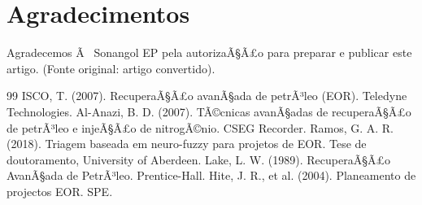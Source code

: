 \documentclass[11pt,a4paper]{article}
\begin{document}
\section*{Agradecimentos}
Agradecemos Ã  Sonangol EP pela autorizaÃ§Ã£o para preparar e publicar este artigo. (Fonte original: artigo convertido).

\begin{thebibliography}{99}
 ISCO, T. (2007). RecuperaÃ§Ã£o avanÃ§ada de petrÃ³leo (EOR). Teledyne Technologies.
 Al-Anazi, B. D. (2007). TÃ©cnicas avanÃ§adas de recuperaÃ§Ã£o de petrÃ³leo e injeÃ§Ã£o de nitrogÃ©nio. CSEG Recorder.
 Ramos, G. A. R. (2018). Triagem baseada em neuro-fuzzy para projetos de EOR. Tese de doutoramento, University of Aberdeen.
 Lake, L. W. (1989). RecuperaÃ§Ã£o AvanÃ§ada de PetrÃ³leo. Prentice-Hall.
 Hite, J. R., et al. (2004). Planeamento de projectos EOR. SPE.
\end{thebibliography}
\end{document}
